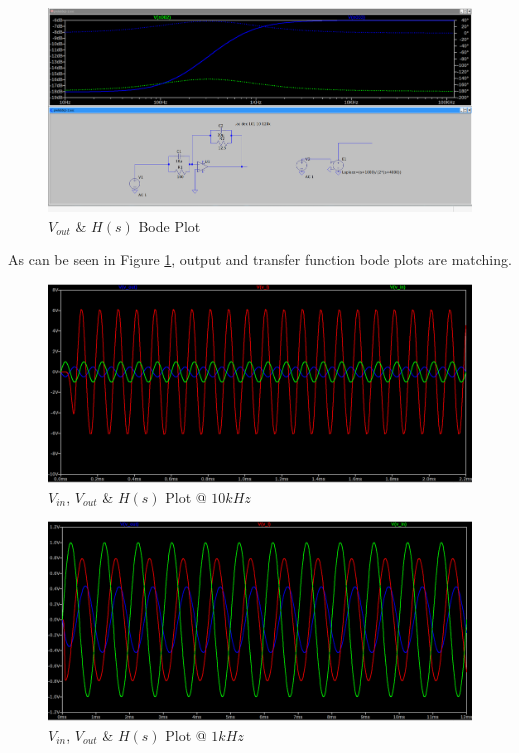 \begin{figure}[h]
    \centering
    \includegraphics[width=1\textwidth]{assets/q2-fixed.png}
    \caption{$V_{out}$ \& $H(s)$ Bode Plot}
    \label{fig:op_amp_v_out_bode_plot}
\end{figure}

As can be seen in Figure \ref{fig:op_amp_v_out_bode_plot}, output and transfer function bode plots are matching.

\begin{figure}[h]
    \centering
    \includegraphics[width=1\textwidth]{assets/opamp-10k.png}
    \caption{$V_{in}$, $V_{out}$ \& $H(s)$ Plot @ $10kHz$}
    \label{fig:op_amp_out_10k}
\end{figure}

\begin{figure}[h]
    \centering
    \includegraphics[width=1\textwidth]{assets/opamp-1k.png}
    \caption{$V_{in}$, $V_{out}$ \& $H(s)$ Plot @ $1kHz$}
    \label{fig:op_amp_out_1k}
\end{figure}

